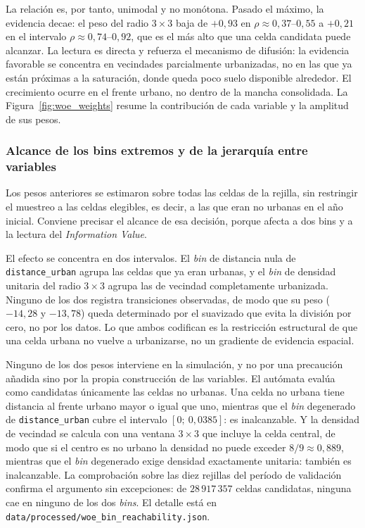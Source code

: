 La relación es, por tanto, unimodal y no monótona. Pasado el máximo, la evidencia decae: el peso del radio $3\times3$ baja de $+0{,}93$ en $\rho \approx 0{,}37$--$0{,}55$ a $+0{,}21$ en el intervalo $\rho \approx 0{,}74$--$0{,}92$, que es el más alto que una celda candidata puede alcanzar. La lectura es directa y refuerza el mecanismo de difusión: la evidencia favorable se concentra en vecindades parcialmente urbanizadas, no en las que ya están próximas a la saturación, donde queda poco suelo disponible alrededor. El crecimiento ocurre en el frente urbano, no dentro de la mancha consolidada. La Figura~\ref{fig:woe_weights} resume la contribución de cada variable y la amplitud de sus pesos.

\subsubsection{Alcance de los bins extremos y de la jerarquía entre variables}
\label{ssec:alcance-iv}

Los pesos anteriores se estimaron sobre todas las celdas de la rejilla, sin restringir el muestreo a las celdas elegibles, es decir, a las que eran no urbanas en el año inicial. Conviene precisar el alcance de esa decisión, porque afecta a dos bins y a la lectura del \textit{Information Value}.

El efecto se concentra en dos intervalos. El \textit{bin} de distancia nula de \texttt{distance\_urban} agrupa las celdas que ya eran urbanas, y el \textit{bin} de densidad unitaria del radio $3\times3$ agrupa las de vecindad completamente urbanizada. Ninguno de los dos registra transiciones observadas, de modo que su peso ($-14{,}28$ y $-13{,}78$) queda determinado por el suavizado que evita la división por cero, no por los datos. Lo que ambos codifican es la restricción estructural de que una celda urbana no vuelve a urbanizarse, no un gradiente de evidencia espacial.

Ninguno de los dos pesos interviene en la simulación, y no por una precaución añadida sino por la propia construcción de las variables. El autómata evalúa como candidatas únicamente las celdas no urbanas. Una celda no urbana tiene distancia al frente urbano mayor o igual que uno, mientras que el \textit{bin} degenerado de \texttt{distance\_urban} cubre el intervalo $[0;\ 0{,}0385]$: es inalcanzable. Y la densidad de vecindad se calcula con una ventana $3\times3$ que incluye la celda central, de modo que si el centro es no urbano la densidad no puede exceder $8/9 \approx 0{,}889$, mientras que el \textit{bin} degenerado exige densidad exactamente unitaria: también es inalcanzable. La comprobación sobre las diez rejillas del período de validación confirma el argumento sin excepciones: de $28\,917\,357$ celdas candidatas, ninguna cae en ninguno de los dos \textit{bins}. El detalle está en \texttt{data/processed/woe\_bin\_reachability.json}.


